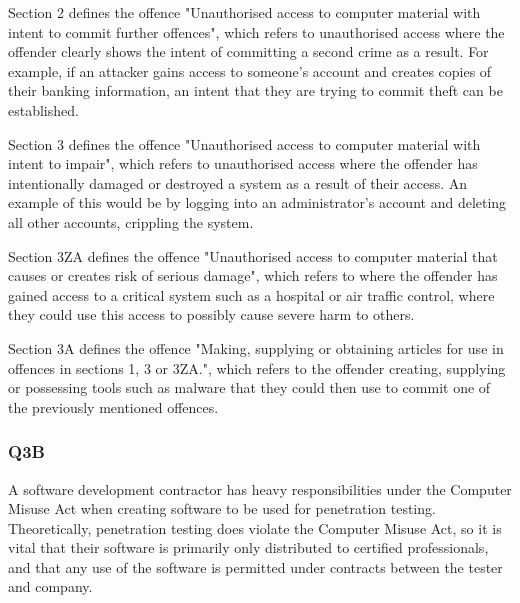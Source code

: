 \documentclass[12pt]{report}
\begin{document}
Section 2 defines the offence "Unauthorised access to computer material with intent to commit further offences", which refers to unauthorised access where the offender clearly shows the intent of committing a second crime as a result. For example, if an attacker gains access to someone's account and creates copies of their banking information, an intent that they are trying to commit theft can be established.

Section 3 defines the offence "Unauthorised access to computer material with intent to impair", which refers to unauthorised access where the offender has intentionally damaged or destroyed a system as a result of their access. An example of this would be by logging into an administrator's account and deleting all other accounts, crippling the system.

Section 3ZA defines the offence "Unauthorised access to computer material that causes or creates risk of serious damage", which refers to where the offender has gained access to a critical system such as a hospital or air traffic control, where they could use this access to possibly cause severe harm to others.

Section 3A defines the offence "Making, supplying or obtaining articles for use in offences in sections 1, 3 or 3ZA.", which refers to the offender creating, supplying or possessing tools such as malware that they could then use to commit one of the previously mentioned offences.

\subsubsection{Q3B}
A software development contractor has heavy responsibilities under the Computer Misuse Act when creating software to be used for penetration testing. Theoretically, penetration testing does violate the Computer Misuse Act, so it is vital that their software is primarily only distributed to certified professionals, and that any use of the software is permitted under contracts between the tester and company.  
\end{document}
